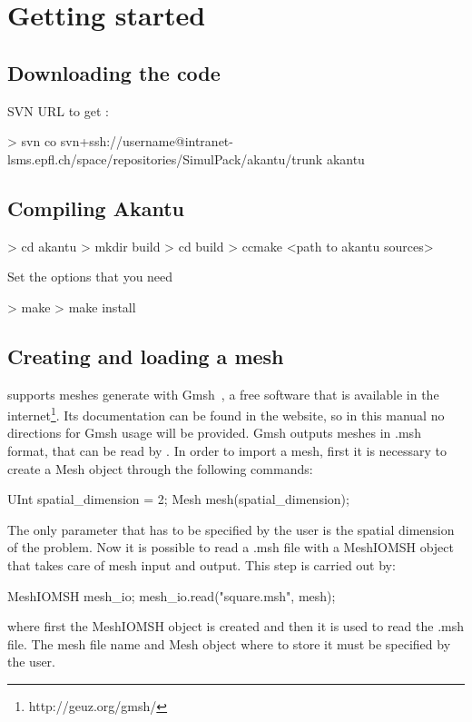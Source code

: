 \section{Getting started}
\subsection{Downloading the code}
SVN URL to get \akantu :
\begin{command}
  > svn co svn+ssh://username@intranet-lsms.epfl.ch/space/repositories/SimulPack/akantu/trunk akantu
\end{command}

\subsection{Compiling Akantu}
\begin{command}
  > cd akantu
  > mkdir build
  > cd build
  > ccmake <path to akantu sources>
\end{command}

Set the options that you need

\begin{command}
  > make
  > make install
\end{command}

\subsection{Creating and loading a mesh\label{sect:common:mesh}}

\akantu supports meshes generate with Gmsh~\cite{gmsh}, a free
software that is available in the
internet\footnote{http://geuz.org/gmsh/}. Its documentation can be
found in the website, so in this manual no directions for Gmsh usage
will be provided. Gmsh outputs meshes in .msh format, that can be read
by \akantu. In order to import a mesh, first it is necessary to create
a Mesh object through the following commands:
\begin{cpp}
  UInt spatial_dimension = 2;
  Mesh mesh(spatial_dimension);
\end{cpp}
The only parameter that has to be specified by the user is the spatial
dimension of the problem. Now it is possible to read a .msh file
with a MeshIOMSH object that takes care of mesh input and output. This
step is carried out by:
\begin{cpp}
  MeshIOMSH mesh_io;
  mesh_io.read("square.msh", mesh);
\end{cpp}
where first the MeshIOMSH object is created and then it is used to
read the .msh file. The mesh file name and Mesh object where to store
it must be specified by the user.
